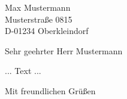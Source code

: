 \documentclass[deRSE,a4paper]{scrlttr2}
\begin{document}

\begin{letter}{
    Max Mustermann\\
    Musterstraße 0815\\
    D-01234 Oberkleindorf
}
\opening{Sehr geehrter Herr Mustermann}
... Text ...

\closing{Mit freundlichen Grüßen}
\end{letter}
\end{document}
